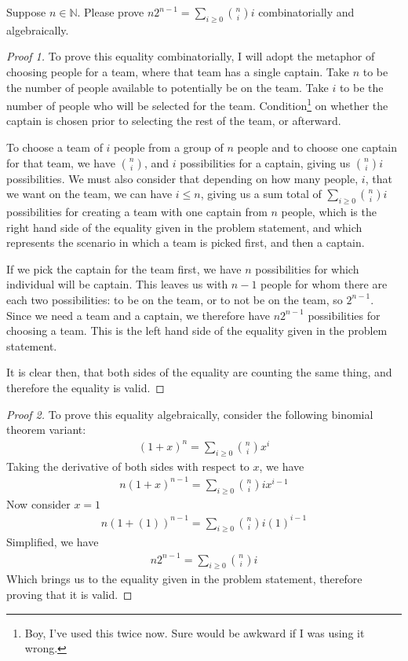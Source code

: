 \documentclass[12pt]{article}
\newcommand{\N}{\mathbb{N}}
\newcommand{\ds}{\displaystyle}
\newenvironment{problem}[2][Problem]{\begin{trivlist}
\item[\hskip \labelsep {\bfseries #1}\hskip \labelsep {\bfseries #2.}]}{\end{trivlist}}
\begin{document}
\begin{problem}{3}
Suppose $n \in \N$. Please prove $\ds n2^{n-1} = \sum_{i \geq 0}\binom{n}{i}i$ combinatorially and algebraically.
\end{problem}

\begin{proof}[Proof 1]
To prove this equality combinatorially, I will adopt the metaphor of choosing people for a team, where that team has a single captain. Take $n$ to be the number of people available to potentially be on the team. Take $i$ to be the number of people who will be selected for the team. Condition\footnote{Boy, I've used this twice now. Sure would be awkward if I was using it wrong.} on whether the captain is chosen prior to selecting the rest of the team, or afterward.

To choose a team of $i$ people from a group of $n$ people and to choose one captain for that team, we have $\binom{n}{i}$, and $i$ possibilities for a captain, giving us $\binom{n}{i}i$ possibilities. We must also consider that depending on how many people, $i$, that we want on the team, we can have $i \leq n$, giving us a sum total of $\sum_{i \geq 0}\binom{n}{i}i$ possibilities for creating a team with one captain from $n$ people, which is the right hand side of the equality given in the problem statement, and which represents the scenario in which a team is picked first, and then a captain.

If we pick the captain for the team first, we have $n$ possibilities for which individual will be captain. This leaves us with $n-1$ people for whom there are each two possibilities: to be on the team, or to not be on the team, so $2^{n-1}$. Since we need a team and a captain, we therefore have $n2^{n-1}$ possibilities for choosing a team. This is the left hand side of the equality given in the problem statement.

It is clear then, that both sides of the equality are counting the same thing, and therefore the equality is valid.
\end{proof}

\begin{proof}[Proof 2]
To prove this equality algebraically, consider the following binomial theorem variant:
\begin{eqnarray}
(1+x)^n = \sum_{i \geq 0}\binom{n}{i}x^i \nonumber
\end{eqnarray}
Taking the derivative of both sides with respect to $x$, we have
\begin{eqnarray}
n(1+x)^{n-1} = \sum_{i\geq 0}\binom{n}{i}ix^{i-1} \nonumber
\end{eqnarray}
Now consider $x=1$
\begin{eqnarray}
n(1+(1))^{n-1} = \sum_{i \geq 0} \binom{n}{i}i(1)^{i-1} \nonumber
\end{eqnarray}
Simplified, we have
\begin{eqnarray}
n2^{n-1} = \sum_{i \geq 0} \binom{n}{i}i \nonumber
\end{eqnarray}
Which brings us to the equality given in the problem statement, therefore proving that it is valid.
\end{proof}
\end{document}
